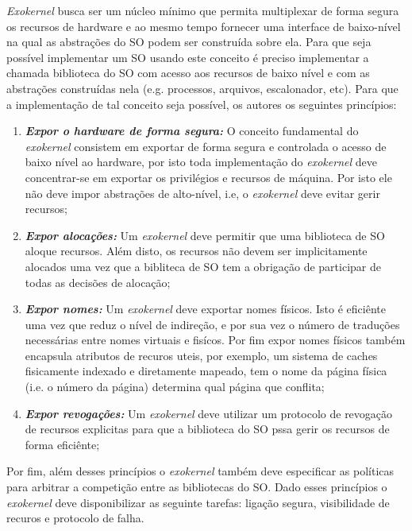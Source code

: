 \emph{Exokernel} busca ser um núcleo mínimo que permita multiplexar de forma
segura os recursos de hardware e ao mesmo tempo fornecer uma interface de
baixo-nível na qual as abstrações do SO podem ser construída sobre ela. Para que
seja possível implementar um SO usando este conceito é preciso implementar a
chamada biblioteca do SO com acesso aos recursos de baixo nível e com as
abstrações construídas nela (e.g. processos, arquivos, escalonador, etc). Para
que a implementação de tal conceito seja possível, os autores os seguintes
princípios:
\begin{enumerate}
  \item \textbf{\emph{Expor o hardware de forma segura:}} O conceito
        fundamental do \emph{exokernel} consistem em exportar de forma segura
        e controlada o acesso de baixo nível ao hardware, por isto toda
        implementação do \emph{exokernel} deve concentrar-se em exportar os
        privilégios e recursos de máquina. Por isto ele não deve impor
        abstrações de alto-nível, i.e, o \emph{exokernel} deve evitar gerir
        recursos;
  \item \textbf{\emph{Expor alocações:}} Um \emph{exokernel} deve permitir que
        uma biblioteca de SO aloque recursos. Além disto, os recursos não devem
        ser implicitamente alocados uma vez que a bibliteca de SO tem a
        obrigação de participar de todas as decisões de alocação;
  \item \textbf{\emph{Expor nomes:}} Um \emph{exokernel} deve exportar nomes
        físicos. Isto é eficiênte uma vez que reduz o nível de indireção, e por
        sua vez o número de traduções necessárias entre nomes virtuais e
        fisícos. Por fim expor nomes físicos também encapsula atributos de
        recuros uteis, por exemplo, um sistema de caches fisicamente indexado
        e diretamente mapeado, tem o nome da página física (i.e. o número da
        página) determina qual página que conflita;
  \item \textbf{\emph{Expor revogações:}} Um \emph{exokernel} deve utilizar um
        protocolo de revogação de recursos explicitas para que a biblioteca do
        SO pssa gerir os recursos de forma eficiênte;
\end{enumerate}
Por fim, além desses princípios o \emph{exokernel} também deve especificar as
políticas para arbitrar a competição entre as bibliotecas do SO. Dado esses
princípios o \emph{exokernel} deve disponibilizar as seguinte tarefas: ligação
segura, visibilidade de recuros e protocolo de falha.

